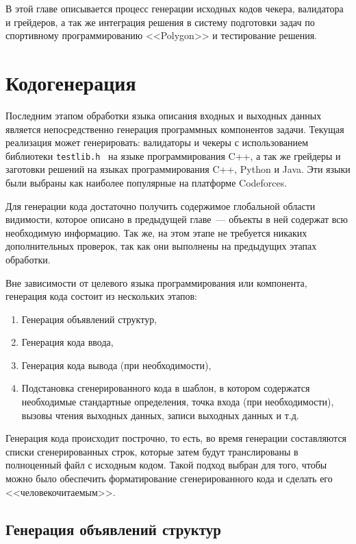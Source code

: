 \documentclass[times,specification,annotation]{style/itmo-student-thesis/itmo-student-thesis}
\begin{document}
В этой главе описывается процесс генерации исходных кодов чекера, валидатора и грейдеров, а так же интеграция решения в систему подготовки задач по спортивному программированию <<Polygon>> и тестирование решения.

\section{Кодогенерация}

Последним этапом обработки языка описания входных и выходных данных является непосредственно генерация программных компонентов задачи. Текущая реализация может генерировать: валидаторы и чекеры с использованием библиотеки \texttt{testlib.h}~\cite{cf-testlib} на языке программирования C++, а так же грейдеры и заготовки решений на языках программирования C++, Python и Java. Эти языки были выбраны как наиболее популярные на платформе Codeforces.

Для генерации кода достаточно получить содержимое глобальной области видимости, которое описано в предыдущей главе~--- объекты в ней содержат всю необходимую информацию. Так же, на этом этапе не требуется никаких дополнительных проверок, так как они выполнены на предыдущих этапах обработки.

Вне зависимости от целевого языка программирования или компонента, генерация кода состоит из нескольких этапов:

\begin{enumerate}
    \item Генерация объявлений структур,
    \item Генерация кода ввода,
    \item Генерация кода вывода (при необходимости),
    \item Подстановка сгенерированного кода в шаблон, в котором содержатся необходимые стандартные определения, точка входа (при необходимости), вызовы чтения выходных данных, записи выходных данных и т.д.
\end{enumerate}

Генерация кода происходит построчно, то есть, во время генерации составляются списки сгенерированных строк, которые затем будут транслированы в полноценный файл с исходным кодом. Такой подход выбран для того, чтобы можно было обеспечить форматирование сгенерированного кода и сделать его <<человекочитаемым>>.

\subsection{Генерация объявлений структур}
\end{document}
